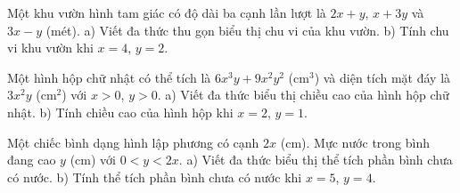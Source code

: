 

\begin{bt}%
	Một khu vườn hình tam giác có độ dài ba cạnh lần lượt là $2x + y$, $x + 3y$ và $3x - y$ (mét).
a) Viết đa thức thu gọn biểu thị chu vi của khu vườn.
b) Tính chu vi khu vườn khi $x = 4$, $y = 2$.
\end{bt}

\begin{bt}%
	Một hình hộp chữ nhật có thể tích là $6x^3y + 9x^2y^2$ ($\text{cm}^3$) và diện tích mặt đáy là $3x^2y$ ($\text{cm}^2$) với $x > 0$, $y > 0$.
a) Viết đa thức biểu thị chiều cao của hình hộp chữ nhật.
b) Tính chiều cao của hình hộp khi $x = 2$, $y = 1$.
\end{bt}

\begin{bt}%
	Một chiếc bình dạng hình lập phương có cạnh $2x$ (cm). Mực nước trong bình đang cao $y$ (cm) với $0 < y < 2x$.
a) Viết đa thức biểu thị thể tích phần bình chưa có nước.
b) Tính thể tích phần bình chưa có nước khi $x = 5$, $y = 4$.
\end{bt}

